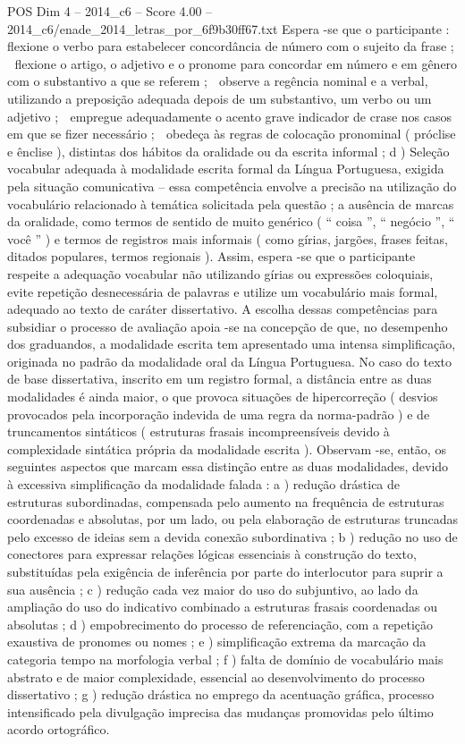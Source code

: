 \begin{textsample}{POS Dim 4 – 2014\_c6 – Score 4.00 – 2014\_c6/enade\_2014\_letras\_por\_6f9b30ff67.txt}
Espera -se que o participante :  flexione o verbo para estabelecer concordância de número com o sujeito da frase ;  flexione o artigo, o adjetivo e o pronome para concordar em número e em gênero com o substantivo a que se referem ;  observe a regência nominal e a verbal, utilizando a preposição adequada depois de um substantivo, um verbo ou um adjetivo ;  empregue adequadamente o acento grave indicador de crase nos casos em que se fizer necessário ;  obedeça às regras de colocação pronominal ( próclise e ênclise ), distintas dos hábitos da oralidade ou da escrita informal ; d ) Seleção vocabular adequada à modalidade escrita formal da Língua Portuguesa, exigida pela situação comunicativa – essa competência envolve a precisão na utilização do vocabulário relacionado à temática solicitada pela questão ; a ausência de marcas da oralidade, como termos de sentido de muito genérico ( “ coisa ”, “ negócio ”, “ você ” ) e termos de registros mais informais ( como gírias, jargões, frases feitas, ditados populares, termos regionais ).
Assim, espera -se que o participante respeite a adequação vocabular não utilizando gírias ou expressões coloquiais, evite repetição desnecessária de palavras e utilize um vocabulário mais formal, adequado ao texto de caráter dissertativo.
A escolha dessas competências para subsidiar o processo de avaliação apoia -se na concepção de que, no desempenho dos graduandos, a modalidade escrita tem apresentado uma intensa simplificação, originada no padrão da modalidade oral da Língua Portuguesa.
No caso do texto de base dissertativa, inscrito em um registro formal, a distância entre as duas modalidades é ainda maior, o que provoca situações de hipercorreção ( desvios provocados pela incorporação indevida de uma regra da norma-padrão ) e de truncamentos sintáticos ( estruturas frasais incompreensíveis devido à complexidade sintática própria da modalidade escrita ).
Observam -se, então, os seguintes aspectos que marcam essa distinção entre as duas modalidades, devido à excessiva simplificação da modalidade falada : a ) redução drástica de estruturas subordinadas, compensada pelo aumento na frequência de estruturas coordenadas e absolutas, por um lado, ou pela elaboração de estruturas truncadas pelo excesso de ideias sem a devida conexão subordinativa ; b ) redução no uso de conectores para expressar relações lógicas essenciais à construção do texto, substituídas pela exigência de inferência por parte do interlocutor para suprir a sua ausência ; c ) redução cada vez maior do uso do subjuntivo, ao lado da ampliação do uso do indicativo combinado a estruturas frasais coordenadas ou absolutas ; d ) empobrecimento do processo de referenciação, com a repetição exaustiva de pronomes ou nomes ; e ) simplificação extrema da marcação da categoria tempo na morfologia verbal ; f ) falta de domínio de vocabulário mais abstrato e de maior complexidade, essencial ao desenvolvimento do processo dissertativo ; g ) redução drástica no emprego da acentuação gráfica, processo intensificado pela divulgação imprecisa das mudanças promovidas pelo último acordo ortográfico.

\end{textsample}
